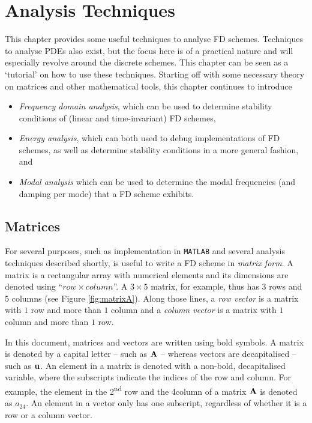 \chapter{Analysis Techniques}\label{ch:analysis}

This chapter provides some useful techniques to analyse FD schemes. Techniques to analyse PDEs also exist, but the focus here is of a practical nature and will especially revolve around the discrete schemes. This chapter can be seen as a `tutorial' on how to use these techniques. 
Starting off with some necessary theory on matrices and other mathematical tools, this chapter continues to introduce 
\begin{itemize}
    \item \textit{Frequency domain analysis}, which can be used to determine stability conditions of (linear and time-invariant) FD schemes,
    \item \textit{Energy analysis}, which can both used to debug implementations of FD schemes, as well as determine stability conditions in a more general fashion, and
    \item \textit{Modal analysis} which can be used to determine the modal frequencies (and damping per mode) that a FD scheme exhibits.
\end{itemize}
\section{Matrices}
For several purposes, such as implementation in \texttt{MATLAB} and several analysis techniques described shortly, is useful to write a FD scheme in \textit{matrix form}. A matrix is a rectangular array with numerical elements and its dimensions are denoted using ``$row \times column$''. A $3\times 5$ matrix, for example, thus has $3$ rows and $5$ columns (see Figure \ref{fig:matrixA}). Along those lines, a \textit{row vector} is a matrix with $1$ row and more than $1$ column and a \textit{column vector} is a matrix with $1$ column and more than $1$ row.  

In this document, matrices and vectors are written using bold symbols. %
A matrix is denoted by a capital letter -- such as $\mathbf{A}$ -- whereas vectors are decapitalised -- such as $\mathbf{u}$. An element in a matrix is denoted with a non-bold, decapitalised variable, where the subscripts indicate the indices of the row and column. For example, the element in the 2\textsuperscript{nd} row and the 4\th column of a matrix $\mathbf{A}$ is denoted as $a_{24}$. An element in a vector only has one subscript, regardless of whether it is a row or a column vector.

